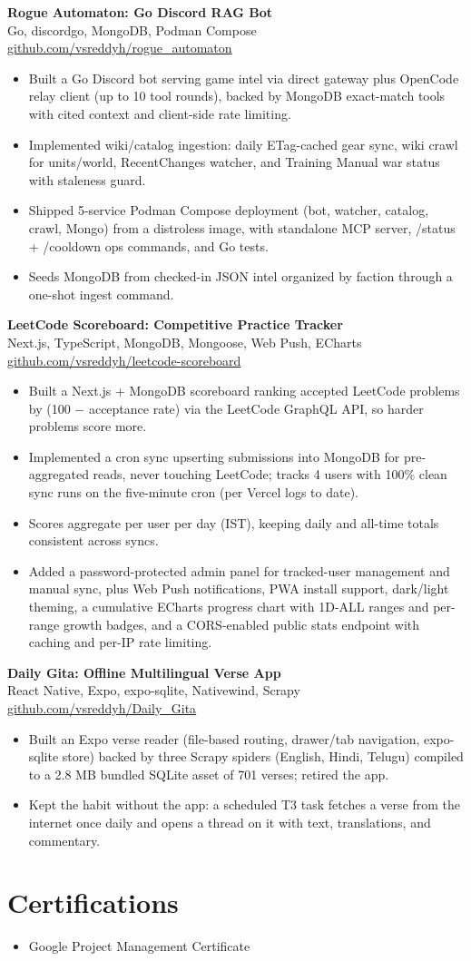 \documentclass[a4paper,11pt]{article}
\newcommand{\resumeItem}[1]{\item \small{#1}}
\newcommand{\resumeSubheading}[4]{%
  \textbf{#1} \hfill \textbf{#2} \\
{#3} \hfill {#4}
}
\newcommand{\resumeSubHeadingListStart}{\begin{itemize}}
\newcommand{\resumeSubHeadingListEnd}{\end{itemize}}
\begin{document}
\resumeSubheading
{Rogue Automaton: Go Discord RAG Bot}{}{Go, discordgo, MongoDB, Podman Compose}{\href{https://github.com/vsreddyh/rogue_automaton}{github.com/vsreddyh/rogue\_automaton}}
\resumeSubHeadingListStart
\resumeItem{Built a Go Discord bot serving game intel via direct gateway plus OpenCode relay client (up to 10 tool rounds), backed by MongoDB exact-match tools with cited context and client-side rate limiting.}
\resumeItem{Implemented wiki/catalog ingestion: daily ETag-cached gear sync, wiki crawl for units/world, RecentChanges watcher, and Training Manual war status with staleness guard.}
\resumeItem{Shipped 5-service Podman Compose deployment (bot, watcher, catalog, crawl, Mongo) from a distroless image, with standalone MCP server, /status + /cooldown ops commands, and Go tests.}
\resumeItem{Seeds MongoDB from checked-in JSON intel organized by faction through a one-shot ingest command.}
\resumeSubHeadingListEnd

\resumeSubheading
{LeetCode Scoreboard: Competitive Practice Tracker}{}{Next.js, TypeScript, MongoDB, Mongoose, Web Push, ECharts}{\href{https://github.com/vsreddyh/leetcode-scoreboard}{github.com/vsreddyh/leetcode-scoreboard}}
\resumeSubHeadingListStart
\resumeItem{Built a Next.js + MongoDB scoreboard ranking accepted LeetCode problems by (100 $-$ acceptance rate) via the LeetCode GraphQL API, so harder problems score more.}
\resumeItem{Implemented a cron sync upserting submissions into MongoDB for pre-aggregated reads, never touching LeetCode; tracks 4 users with 100\% clean sync runs on the five-minute cron (per Vercel logs to date).}
\resumeItem{Scores aggregate per user per day (IST), keeping daily and all-time totals consistent across syncs.}
\resumeItem{Added a password-protected admin panel for tracked-user management and manual sync, plus Web Push notifications, PWA install support, dark/light theming, a cumulative ECharts progress chart with 1D-ALL ranges and per-range growth badges, and a CORS-enabled public stats endpoint with caching and per-IP rate limiting.}
\resumeSubHeadingListEnd

\resumeSubheading
{Daily Gita: Offline Multilingual Verse App}{}{React Native, Expo, expo-sqlite, Nativewind, Scrapy}{\href{https://github.com/vsreddyh/Daily_Gita}{github.com/vsreddyh/Daily\_Gita}}
\resumeSubHeadingListStart
\resumeItem{Built an Expo verse reader (file-based routing, drawer/tab navigation, expo-sqlite store) backed by three Scrapy spiders (English, Hindi, Telugu) compiled to a 2.8 MB bundled SQLite asset of 701 verses; retired the app.}
\resumeItem{Kept the habit without the app: a scheduled T3 task fetches a verse from the internet once daily and opens a thread on it with text, translations, and commentary.}
\resumeSubHeadingListEnd


\vspace{-0.6em}




\section*{Certifications}
\begin{itemize}
\resumeItem{Google Project Management Certificate}
\end{itemize}
\end{document}
